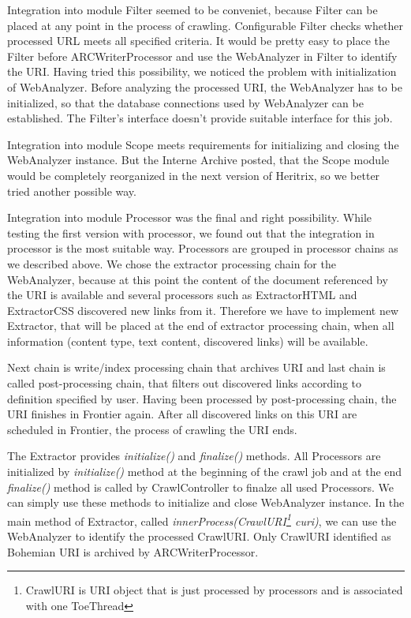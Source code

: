 \documentclass[11pt,a4paper]{article}
\begin{document}
Integration into module Filter seemed to be conveniet, because Filter can be placed at any point in the process of crawling. Configurable Filter checks whether processed URL meets all specified criteria. It would be pretty easy to place the Filter before ARCWriterProcessor and use the WebAnalyzer in Filter to identify the URI. Having tried this possibility, we noticed the problem with initialization of WebAnalyzer. Before analyzing the processed URI, the WebAnalyzer has to be initialized, so that the database connections used by WebAnalyzer can be established. The Filter's interface doesn't provide suitable interface for this job.

Integration into module Scope meets requirements for initializing and closing the WebAnalyzer instance. But the Interne Archive posted, that the Scope module would be completely reorganized in the next version of Heritrix, so we better tried another possible way.

Integration into module Processor was the final and right possibility. While testing the first version with processor, we found out that the integration in processor is the most suitable way. Processors are grouped in processor chains as we described above. We chose the extractor processing chain for the WebAnalyzer, because at this point the content of the document referenced by the URI is available and several processors such as ExtractorHTML and ExtractorCSS discovered new links from it. Therefore we have to implement new Extractor, that will be placed at the end of extractor processing chain, when all information (content type, text content, discovered links) will be available.

Next chain is write/index processing chain that archives URI and last chain is called post-processing chain, that filters out discovered links according to definition specified by user. Having been processed by post-processing chain, the URI finishes in Frontier again. After all discovered links on this URI are scheduled in Frontier, the process of crawling the URI ends.

The Extractor provides \emph{initialize()} and \emph{finalize()} methods. All Processors are initialized by \emph{initialize()} method at the beginning of the crawl job and at the end \emph{finalize()} method is called by CrawlController to finalze all used Processors. We can simply use these methods to initialize and close WebAnalyzer instance. In the main method of Extractor, called \emph{innerProcess(CrawlURI\footnote{CrawlURI is URI object that is just processed by processors and is associated with one ToeThread} curi)}, we can use the WebAnalyzer to identify the processed CrawlURI. Only CrawlURI identified as Bohemian URI is archived by ARCWriterProcessor.
\end{document}
